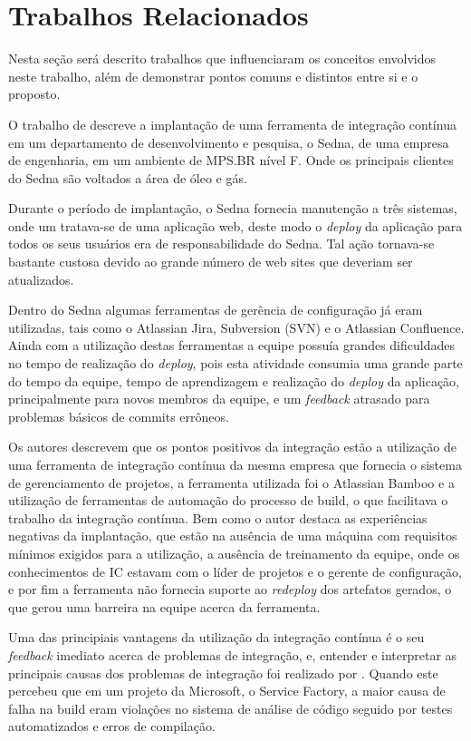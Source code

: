 \chapter{Trabalhos Relacionados}\label{trabalhorel}
Nesta seção será descrito trabalhos que influenciaram os conceitos envolvidos neste trabalho, além de demonstrar pontos comuns e distintos entre si e o proposto.

O trabalho de  descreve a implantação de uma ferramenta de integração contínua em um departamento de desenvolvimento e pesquisa, o Sedna, de uma empresa de engenharia, em um ambiente de MPS.BR nível F. Onde os principais clientes do Sedna são voltados a área de óleo e gás.

Durante o período de implantação, o Sedna fornecia manutenção a três sistemas, onde um tratava-se de uma aplicação web, deste modo o \textit{deploy} da aplicação para todos os seus usuários era de responsabilidade do Sedna. Tal ação tornava-se bastante custosa devido ao grande número de web sites que deveriam ser atualizados.
	
Dentro do Sedna algumas ferramentas de gerência de configuração já eram utilizadas, tais como o Atlassian Jira, Subversion (SVN) e o Atlassian Confluence. Ainda com a utilização destas ferramentas a equipe possuía grandes dificuldades no tempo de realização do \textit{deploy}, pois esta atividade consumia uma grande parte do tempo da equipe, tempo de aprendizagem e realização do \textit{deploy} da aplicação, principalmente para novos membros da equipe, e um \textit{feedback} atrasado para problemas básicos de commits errôneos.

Os autores descrevem que os pontos positivos da integração estão a utilização de uma ferramenta de integração contínua da mesma empresa que fornecia o sistema de gerenciamento de projetos, a ferramenta utilizada foi o Atlassian Bamboo e a utilização de ferramentas de automação do processo de build, o que facilitava o trabalho da integração contínua. Bem como o autor destaca as experiências negativas da implantação, que estão na ausência de uma máquina com requisitos mínimos exigidos para a utilização, a ausência de treinamento da equipe, onde os conhecimentos de IC estavam com o líder de projetos e o gerente de configuração, e por fim a ferramenta não fornecia suporte ao \textit{redeploy} dos artefatos gerados, o que gerou uma barreira na equipe acerca da ferramenta.


Uma das principiais vantagens da utilização da integração contínua é o seu \textit{feedback} imediato acerca de problemas de integração, e, entender e interpretar as principais causas dos problemas de integração foi realizado por . Quando este percebeu que em um projeto da Microsoft, o Service Factory, a maior causa de falha na build eram violações no sistema de análise de código seguido por testes automatizados e erros de compilação.

